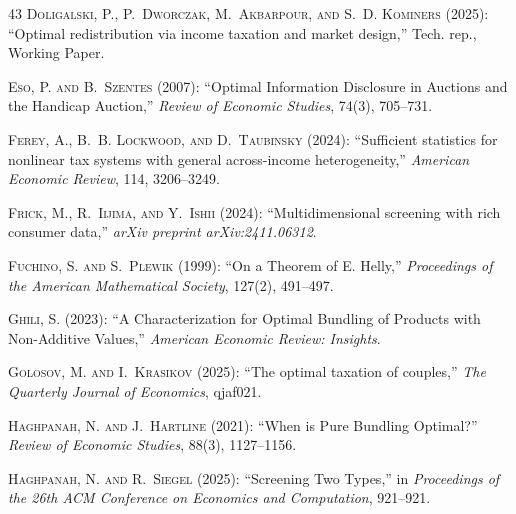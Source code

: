 \documentclass[12pt,letterpaper]{article}
\theoremstyle{plain}
\theoremstyle{definition}
\theoremstyle{remark}
\renewcommand{\1}{\mathds{1}}
\theoremstyle{definition}
\begin{document}
\begin{thebibliography}{43}
\textsc{Doligalski, P., P.~Dworczak, M.~Akbarpour, and S.~D. Kominers} (2025): \enquote{Optimal redistribution via income taxation and market design,} Tech. rep., Working Paper.

\textsc{Eso, P. and B.~Szentes} (2007): \enquote{{Optimal Information Disclosure in Auctions and the Handicap Auction},} \emph{Review of Economic Studies}, 74(3), 705--731.

\textsc{Ferey, A., B.~B. Lockwood, and D.~Taubinsky} (2024): \enquote{Sufficient statistics for nonlinear tax systems with general across-income heterogeneity,} \emph{American Economic Review}, 114, 3206--3249.

\textsc{Frick, M., R.~Iijima, and Y.~Ishii} (2024): \enquote{Multidimensional screening with rich consumer data,} \emph{arXiv preprint arXiv:2411.06312}.

\textsc{Fuchino, S. and S.~Plewik} (1999): \enquote{On a Theorem of E. Helly,} \emph{Proceedings of the American Mathematical Society}, 127(2), 491--497.

\textsc{Ghili, S.} (2023): \enquote{A Characterization for Optimal Bundling of Products with Non-Additive Values,} \emph{American Economic Review: Insights}.

\textsc{Golosov, M. and I.~Krasikov} (2025): \enquote{The optimal taxation of couples,} \emph{The Quarterly Journal of Economics}, qjaf021.

\textsc{Haghpanah, N. and J.~Hartline} (2021): \enquote{When is Pure Bundling Optimal?} \emph{Review of Economic Studies}, 88(3), 1127--1156.

\textsc{Haghpanah, N. and R.~Siegel} (2025): \enquote{Screening Two Types,} in \emph{Proceedings of the 26th ACM Conference on Economics and Computation}, 921--921.


\end{thebibliography}
\end{document}
